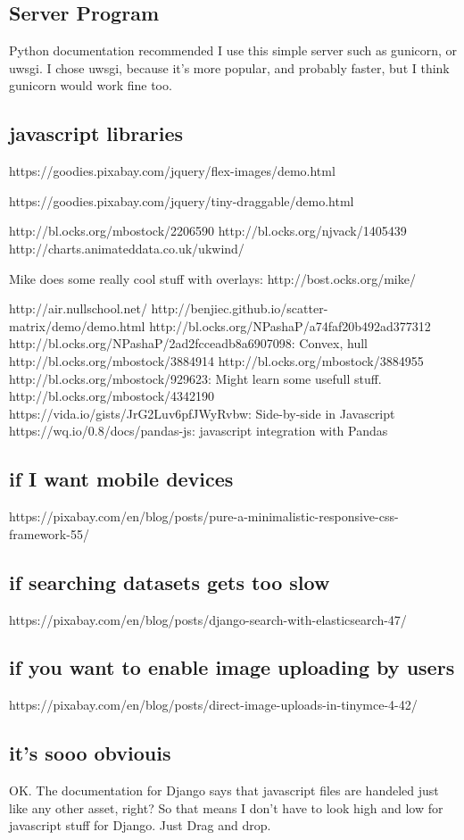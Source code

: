 \subsection{Server Program}

Python documentation recommended I use this simple server such as gunicorn, or uwsgi.  I chose uwsgi, because it's more popular, and probably faster, but I think gunicorn would work fine too.



\subsection{javascript libraries}

https://goodies.pixabay.com/jquery/flex-images/demo.html

https://goodies.pixabay.com/jquery/tiny-draggable/demo.html

http://bl.ocks.org/mbostock/2206590
http://bl.ocks.org/njvack/1405439
http://charts.animateddata.co.uk/ukwind/

Mike does some really cool stuff with overlays:  http://bost.ocks.org/mike/

http://air.nullschool.net/
http://benjiec.github.io/scatter-matrix/demo/demo.html
http://bl.ocks.org/NPashaP/a74faf20b492ad377312
http://bl.ocks.org/NPashaP/2ad2fcceadb8a6907098: Convex, hull
http://bl.ocks.org/mbostock/3884914
http://bl.ocks.org/mbostock/3884955
http://bl.ocks.org/mbostock/929623:     Might learn some usefull stuff.
http://bl.ocks.org/mbostock/4342190
https://vida.io/gists/JrG2Luv6pfJWyRvbw:  Side-by-side in Javascript
https://wq.io/0.8/docs/pandas-js:       javascript integration with Pandas

\subsection{if I want mobile devices}

https://pixabay.com/en/blog/posts/pure-a-minimalistic-responsive-css-framework-55/

\subsection{if searching datasets gets too slow}

https://pixabay.com/en/blog/posts/django-search-with-elasticsearch-47/

\subsection{if you want to enable image uploading by users}

https://pixabay.com/en/blog/posts/direct-image-uploads-in-tinymce-4-42/

\subsection{it's sooo obviouis}

OK.  The documentation for Django says that javascript files are handeled just like any other asset, right?   So that means I don't have to look high and low for javascript stuff for Django.  Just Drag and drop.
